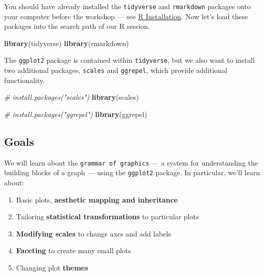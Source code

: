 \documentclass[
]{book}
\newenvironment{Shaded}{\begin{snugshade}}{\end{snugshade}}
\newcommand{\CommentTok}[1]{\textcolor[rgb]{0.56,0.35,0.01}{\textit{#1}}}
\newcommand{\KeywordTok}[1]{\textcolor[rgb]{0.13,0.29,0.53}{\textbf{#1}}}
\newcommand{\NormalTok}[1]{#1}
\providecommand{\tightlist}{%
  \setlength{\itemsep}{0pt}\setlength{\parskip}{0pt}}
\begin{document}
You should have already installed the \texttt{tidyverse} and \texttt{rmarkdown}
packages onto your computer before the workshop
--- see \href{./Rinstall.html}{R Installation}.
Now let's load these packages into the search path of our R session.

\begin{Shaded}
\begin{Highlighting}[]
\KeywordTok{library}\NormalTok{(tidyverse)}
\KeywordTok{library}\NormalTok{(rmarkdown)}
\end{Highlighting}
\end{Shaded}

The \texttt{ggplot2} package is contained within \texttt{tidyverse}, but we also want to
install two additional packages, \texttt{scales} and \texttt{ggrepel}, which provide
additional functionality.

\begin{Shaded}
\begin{Highlighting}[]
\CommentTok{\# install.packages("scales")}
\KeywordTok{library}\NormalTok{(scales)}

\CommentTok{\# install.packages("ggrepel") }
\KeywordTok{library}\NormalTok{(ggrepel)}
\end{Highlighting}
\end{Shaded}

\hypertarget{goals-2}{%
\subsection{Goals}\label{goals-2}}

\begin{alert}

We will learn about the \texttt{grammar\ of\ graphics} --- a system for understanding
the building blocks of a graph --- using the \texttt{ggplot2} package. In particular,
we'll learn about:

\begin{enumerate}
\def\labelenumi{\arabic{enumi}.}
\tightlist
\item
  Basic plots, \textbf{aesthetic mapping and inheritance}
\item
  Tailoring \textbf{statistical transformations} to particular plots
\item
  \textbf{Modifying scales} to change axes and add labels
\item
  \textbf{Faceting} to create many small plots
\item
  Changing plot \textbf{themes}
\end{enumerate}

\end{alert}
\end{document}
